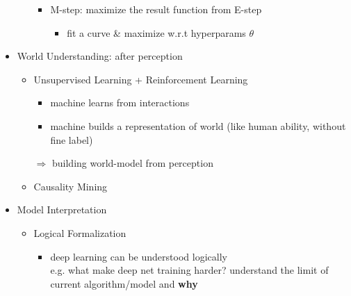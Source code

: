 \begin{itemize}
\begin{itemize}
\begin{itemize}
		\item M-step: maximize the result function from E-step
			\begin{itemize}
			\item fit a curve \& maximize w.r.t hyperparams $\theta$
			\end{itemize}
		\end{itemize}
	\end{itemize}
\item World Understanding: after perception
	\begin{itemize}
	\item Unsupervised Learning + Reinforcement Learning
		\begin{itemize}
		\item machine learns from interactions
		\item machine builds a representation of world (like human ability, without fine label)
		\end{itemize}
	$\Rightarrow$ building world-model from perception
	\item Causality Mining
	\end{itemize}
\item Model Interpretation
	\begin{itemize}
	\item Logical Formalization
		\begin{itemize}
		\item deep learning can be understood logically \\
			e.g. what make deep net training harder? understand the limit of current algorithm/model and \textbf{why}
		\end{itemize}
	\end{itemize}
\end{itemize}

